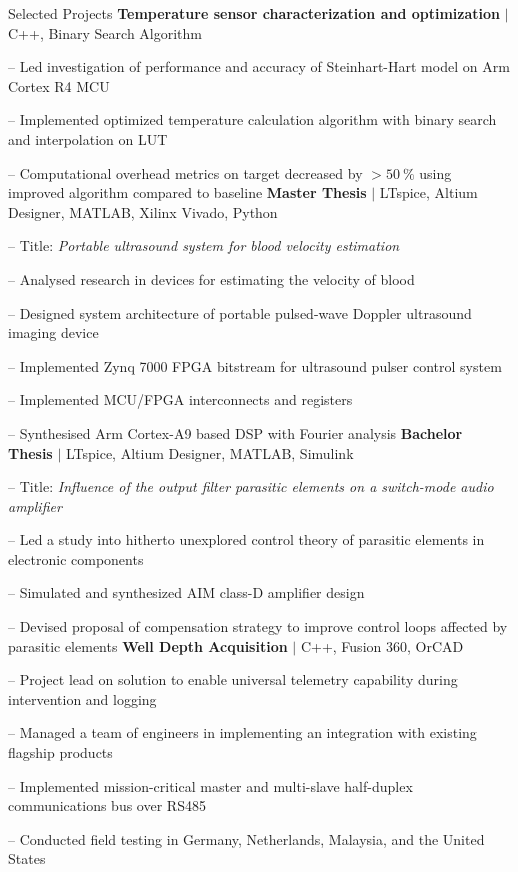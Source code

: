 
\begin{rubric}{\faTasks[solid]  Selected Projects}
\entry*[2024][] \textbf{Temperature sensor characterization and optimization} $|$ C++, Binary Search Algorithm \par
	-- Led investigation of performance and accuracy of Steinhart-Hart model on Arm Cortex\textsuperscript{\textcopyright} R4 MCU \par
	-- Implemented optimized temperature calculation algorithm with binary search and interpolation on LUT \par
	-- Computational overhead metrics on target decreased by $>\qty{50}{\percent}$ using improved algorithm compared to baseline
\entry*[2023][]%
	\textbf{Master Thesis} $|$ LTspice, Altium Designer, MATLAB, Xilinx Vivado, Python \par
	-- Title: \emph{Portable ultrasound system for blood velocity estimation} \par
	-- Analysed research in devices for estimating the velocity of blood \par
	-- Designed system architecture of portable pulsed-wave Doppler ultrasound imaging device \par
	-- Implemented Zynq 7000 FPGA bitstream for ultrasound pulser control system \par
	-- Implemented MCU/FPGA interconnects and registers \par
	-- Synthesised Arm Cortex\textsuperscript{\textcopyright}-A9 based DSP with Fourier analysis
%
\entry*[2020][] \textbf{Bachelor Thesis} $|$ LTspice, Altium Designer, MATLAB, Simulink \par
	-- Title: \emph{Influence of the output filter parasitic elements on a switch-mode audio amplifier} \par
	-- Led a study into hitherto unexplored control theory of parasitic elements in electronic components \par
	-- Simulated and synthesized AIM class-D amplifier design \par
	-- Devised proposal of compensation strategy to improve control loops affected by parasitic elements
%
\entry*[2017][] \textbf{Well Depth Acquisition} $|$ C++, Fusion 360, OrCAD \par
	-- Project lead on solution to enable universal telemetry capability during intervention and logging \par
	-- Managed a team of engineers in implementing an integration with existing flagship products \par
	-- Implemented mission-critical master and multi-slave half-duplex communications bus over RS485 \par
	-- Conducted field testing in Germany, Netherlands, Malaysia, and the United States
%
\end{rubric}